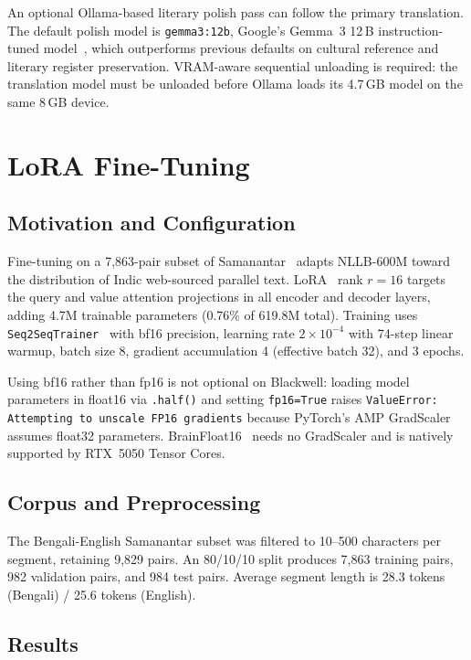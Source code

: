 \documentclass[sigconf]{acmart}
\begin{document}
An optional Ollama-based literary polish pass can follow the primary translation.
The default polish model is \texttt{gemma3:12b}, Google's Gemma~3 12\,B
instruction-tuned model~\cite{gemma2025}, which outperforms previous defaults on
cultural reference and literary register preservation.
VRAM-aware sequential unloading is required: the translation model must be
unloaded before Ollama loads its 4.7\,GB model on the same 8\,GB device.

\section{LoRA Fine-Tuning}

\subsection{Motivation and Configuration}

Fine-tuning on a 7,863-pair subset of Samanantar~\cite{samanantar2022} adapts
NLLB-600M toward the distribution of Indic web-sourced parallel text.
LoRA~\cite{hu2021lora} rank $r=16$ targets the query and value attention
projections in all encoder and decoder layers, adding 4.7M trainable parameters
(0.76\% of 619.8M total).
Training uses \texttt{Seq2SeqTrainer}~\cite{wolf2020transformers} with bf16
precision, learning rate $2\times10^{-4}$ with 74-step linear warmup, batch
size 8, gradient accumulation 4 (effective batch 32), and 3 epochs.

Using bf16 rather than fp16 is not optional on Blackwell: loading model parameters
in float16 via \texttt{.half()} and setting \texttt{fp16=True} raises
\texttt{ValueError: Attempting to unscale FP16 gradients} because PyTorch's AMP
GradScaler assumes float32 parameters.
BrainFloat16~\cite{micikevicius2018mixed} needs no GradScaler and is natively
supported by RTX~5050 Tensor Cores.

\subsection{Corpus and Preprocessing}

The Bengali-English Samanantar subset was filtered to 10--500 characters per
segment, retaining 9,829 pairs.
An 80/10/10 split produces 7,863 training pairs, 982 validation pairs, and
984 test pairs.
Average segment length is 28.3 tokens (Bengali) / 25.6 tokens (English).

\subsection{Results}
\end{document}
